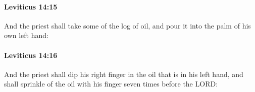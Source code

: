 		\paragraph{Leviticus 14:15} %
			\label{LEVITICUS-14-15}

			And the priest shall take some of the log of oil, and pour it into the palm of his own left hand:


		\paragraph{Leviticus 14:16} %
			\label{LEVITICUS-14-16}

			And the priest shall dip his right finger in the oil that is in his left hand, and shall sprinkle of the oil with his finger seven times before the LORD:


